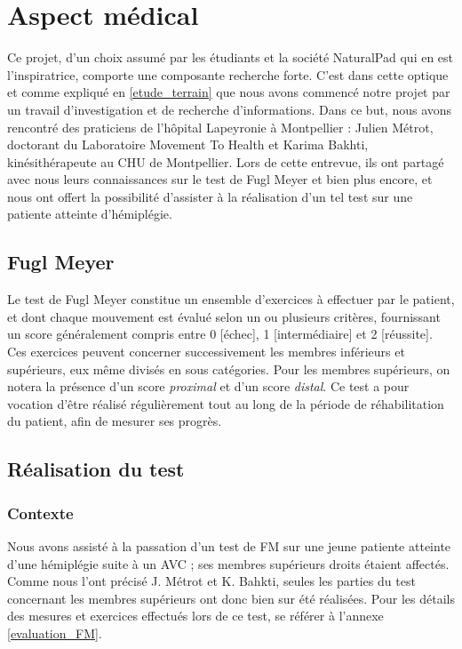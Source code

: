 \documentclass[french,12pt]{report}
\begin{document}
		
		\section{Aspect médical} \label{lapeyronie}		%
Ce projet, d'un choix assumé par les étudiants et la société NaturalPad qui en est l'inspiratrice, comporte une composante recherche forte. C'est dans cette optique et comme expliqué en \ref{etude_terrain} que nous avons commencé notre projet par un travail d'investigation et de recherche d'informations. Dans ce but, nous avons rencontré des praticiens de l'hôpital Lapeyronie à Montpellier : Julien Métrot, doctorant du Laboratoire Movement To Health et Karima Bakhti, kinésithérapeute au CHU de Montpellier. Lors de cette entrevue, ils ont partagé avec nous leurs connaissances sur le test de Fugl Meyer et bien plus encore, et nous ont offert la possibilité d'assister à la réalisation d'un tel test sur une patiente atteinte d'hémiplégie.
	\subsection{Fugl Meyer}\label{fugl_meyer}
Le test de Fugl Meyer constitue un ensemble d'exercices à effectuer par le patient, et dont chaque mouvement est évalué selon un ou plusieurs critères, fournissant un score généralement compris entre 0 [échec], 1 [intermédiaire] et 2 [réussite]. Ces exercices peuvent concerner successivement les membres inférieurs et supérieurs, eux même divisés en sous catégories. Pour les membres supérieurs, on notera la présence d'un score \textit{proximal} et d'un score \textit{distal}. Ce test a pour vocation d'être réalisé régulièrement tout au long de la période de réhabilitation du patient, afin de mesurer ses progrès.
	\subsection{Réalisation du test}
				\subsubsection{Contexte}
Nous avons assisté à la passation d'un test de FM sur une jeune patiente atteinte d'une hémiplégie suite à un AVC ; ses membres supérieurs droits étaient affectés. Comme nous l'ont précisé J. Métrot et K. Bahkti, seules les parties du test concernant les membres supérieurs ont donc bien sur été réalisées. Pour les détails des mesures et exercices effectués lors de ce test, se référer à l'annexe \ref{evaluation_FM}.
\end{document}
